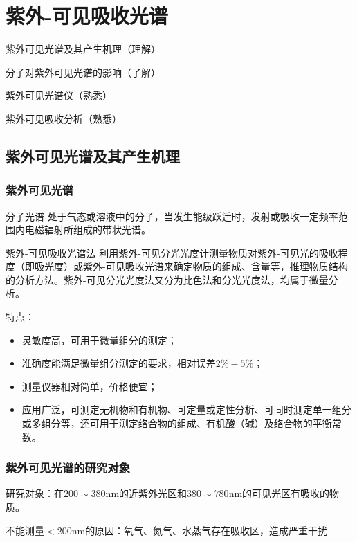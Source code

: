 \chapter{紫外-可见吸收光谱}
\begin{introduction}
    \item 紫外可见光谱及其产生机理（理解）
    \item 分子对紫外可见光谱的影响（了解）
    \item 紫外可见光谱仪（熟悉）
    \item 紫外可见吸收分析（熟悉）
\end{introduction}
\section{紫外可见光谱及其产生机理}
\subsection{紫外可见光谱}
\begin{definition*}{分子光谱}
    处于气态或溶液中的分子，当发生能级跃迁时，发射或吸收一定频率范围内电磁辐射所组成的带状光谱。
\end{definition*}
\begin{definition*}{紫外-可见吸收光谱法}
    利用紫外-可见分光光度计测量物质对紫外-可见光的吸收程度（即吸光度）或紫外-可见吸收光谱来确定物质的组成、含量等，推理物质结构的分析方法。紫外-可见分光光度法又分为比色法和分光光度法，均属于微量分析。
\end{definition*}
特点：
\begin{itemize}
    \item 灵敏度高，可用于微量组分的测定；
    \item 准确度能满足微量组分测定的要求，相对误差$2\%-5\%$；
    \item 测量仪器相对简单，价格便宜；
    \item 应用广泛，可测定无机物和有机物、可定量或定性分析、可同时测定单一组分或多组分等，还可用于测定络合物的组成、有机酸（碱）及络合物的平衡常数。
\end{itemize}
\subsection{紫外可见光谱的研究对象}
研究对象：在$200\sim 380\mathrm{nm}$的近紫外光区和$380\sim 780\mathrm{nm}$的可见光区有吸收的物质。
\begin{note}
    不能测量$<200\mathrm{nm}$的原因：氧气、氮气、水蒸气存在吸收区，造成严重干扰
\end{note}
